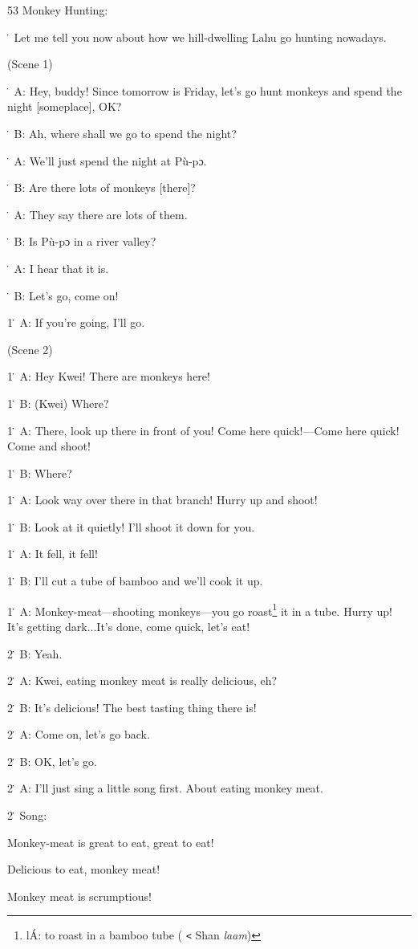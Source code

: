 
53 Monkey Hunting:

\. Let me tell you now about how we hill-dwelling Lahu go hunting nowadays.

(Scene 1)

\. A: Hey, buddy!  Since tomorrow is Friday, let's go hunt monkeys and spend the
night [someplace], OK?

\. B: Ah, where shall we go to spend the night?

\. A: We'll just spend the night at Pù-pɔ.

\. B: Are there lots of monkeys [there]?

\. A: They say there are lots of them.

\. B: Is Pù-pɔ in a river valley?

\. A: I hear that it is.

\. B: Let's go, come on!

1\. A: If you're going, I'll go.

(Scene 2)

1\. A: Hey Kwei!  There are monkeys here!

1\. B: (Kwei) Where?

1\. A: There, look up there in front of you!  Come here quick!---Come here quick!
Come and shoot!

1\. B: Where?

1\. A: Look way over there in that branch!  Hurry up and shoot!

1\. B: Look at it quietly!  I'll shoot it down for you.

1\. A: It fell, it fell!

1\. B: I'll cut a tube of bamboo and we'll cook it up.

1\. A: Monkey-meat---shooting monkeys---you go roast\footnote{lÁ: to roast in a bamboo tube ( \texttt{<} Shan \textit{laam})} it in a tube.  Hurry up!
It's getting dark...It's done, come quick, let's eat!

2\. B: Yeah.

2\. A: Kwei, eating monkey meat is really delicious, eh?

2\. B: It's delicious!  The best tasting thing there is!

2\. A: Come on, let's go back.

2\. B: OK, let's go.

2\. A: I'll just sing a little song first.  About eating monkey meat.

2\. Song:

Monkey-meat is great to eat, great to eat!

Delicious to eat, monkey meat!

Monkey meat is scrumptious!

